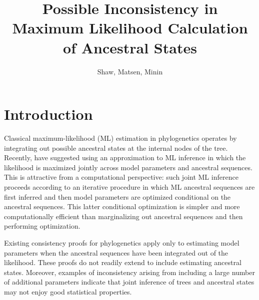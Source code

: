 \documentclass[a4paper]{article}
\title{Possible Inconsistency in Maximum Likelihood Calculation of Ancestral States}
\author{Shaw, Matsen, Minin}
\begin{document}
\maketitle


\renewcommand{\arraystretch}{1.2} %


\section*{Introduction}

Classical maximum-likelihood (ML) estimation in phylogenetics operates by integrating out possible ancestral states at the internal nodes of the tree.
Recently, \cite{Neher2017} have suggested using an approximation to ML inference in which the likelihood is maximized jointly across model parameters and ancestral sequences.
This is attractive from a computational perspective: such joint ML inference proceeds according to an iterative procedure in which ML ancestral sequences are first inferred and then model parameters are optimized conditional on the ancestral sequences.
This latter conditional optimization is simpler and more computationally efficient than marginalizing out ancestral sequences and then performing optimization.

Existing consistency proofs for phylogenetics \cite{RoyChoudhury2015-ta} apply only to estimating model parameters when the ancestral sequences have been integrated out of the likelihood.
These proofs do not readily extend to include estimating ancestral states.
Moreover, examples of inconsistency arising from including a large number of additional parameters \cite{Neyman1948-ta} indicate that joint inference of trees and ancestral states may not enjoy good statistical properties.
\end{document}
